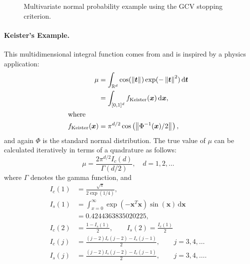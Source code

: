 \documentclass[twocolumn]{svjour3}          %
\newcommand{\bm}[1]{\boldsymbol{#1}}
\newcommand{\dif}[1]{\text{d}{#1}}
\newcommand{\reals}{\mathbb{R}}
\newcommand{\vt}{\bm{t}}
\newcommand{\vx}{\bm{x}}
\newcommand{\dvx}{\dif{\bm{x}}}
\newcommand{\dvt}{\dif{\bm{t}}}
\newcommand{\norm}[2][{}]{\ensuremath{\left \lVert #2 \right \rVert}_{#1}}
\begin{document}
\begin{figure}
	\caption[MVN guaranteed : GCV]{Multivariate normal probability example using the GCV stopping criterion.}
	\label{fig:mvn-guaranteed-GCV}
\end{figure}

\paragraph{Keister's Example.}

This multidimensional integral function comes from \cite{Kei96} and is inspired by a physics application:
\begin{align*}
\mu & =  \int_{\reals^d} \cos(\norm{ \vt}) \exp(-\norm{ \vt }^2) \, \dvt \\
\nonumber
& = \int_{[0,1]^d} f_{\textup{Keister}}(\vx) \, \dvx,\\
\intertext{where }
f_\textup{Keister}(\vx) &= \pi^{d/2} \cos\left(\norm{ \Phi^{-1}(\vx)/2}\right)  ,
\end{align*}
and again $\Phi$ is the standard normal distribution.
The true value of $\mu$ can be calculated iteratively in terms of a quadrature as follows:  
\begin{equation*}
\mu = \frac{2 \pi^{d/2} I_c(d)}{\Gamma(d/2)}, \quad d=1,2, \ldots
\end{equation*}
where $\Gamma$ denotes the gamma function, and
\begin{align*}
I_c(1) &= \frac{\sqrt{\pi}}{2 \exp(1/4)}, 
\\
I_s(1) &= \int_{x=0}^\infty \exp(-\vx^T\vx)\sin(\vx) \, \dvx 
\\
& =  0.4244363835020225,
\\
I_c(2) &= \frac{1-I_s(1)}{2}, \qquad
I_s(2) = \frac{I_c(1)}{2}
\\
I_c(j) &= \frac{(j-2)I_c(j-2)-I_s(j-1)}{2},
\qquad j =3,4,\ldots
\\
I_s(j) &= \frac{(j-2)I_s(j-2)-I_c(j-1)}{2},
\qquad j =3,4,\ldots.
\end{align*}
\end{document}
